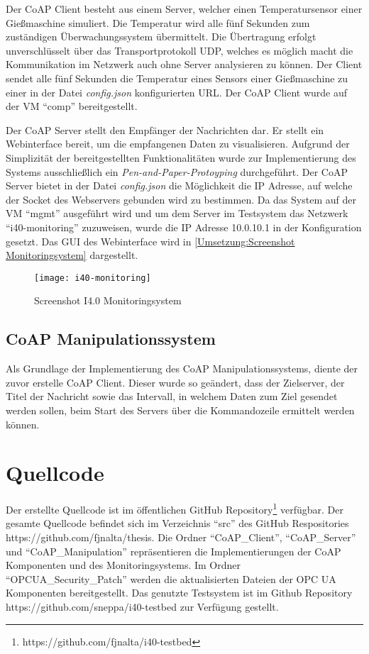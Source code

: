 Der \ac{CoAP} Client besteht aus einem Server, welcher einen Temperatursensor einer Gießmaschine simuliert. Die Temperatur wird alle fünf Sekunden zum zuständigen Überwachungssystem übermittelt. Die Übertragung erfolgt unverschlüsselt über das Transportprotokoll \ac{UDP}, welches es möglich macht die Kommunikation im Netzwerk auch ohne Server analysieren zu können. Der Client sendet alle fünf Sekunden die Temperatur eines Sensors einer Gießmaschine zu einer in der Datei \textit{config.json} konfigurierten \ac{URL}. Der \ac{CoAP} Client wurde auf der \ac{VM} "`comp"' bereitgestellt.

Der \ac{CoAP} Server stellt den Empfänger der Nachrichten dar. Er stellt ein Webinterface bereit, um die empfangenen Daten zu visualisieren. Aufgrund der Simplizität der bereitgestellten Funktionalitäten wurde zur Implementierung des Systems ausschließlich ein \textit{Pen-and-Paper-Protoyping} durchgeführt. Der \ac{CoAP} Server bietet in der Datei \textit{config.json} die Möglichkeit die \ac{IP} Adresse, auf welche der Socket des Webservers gebunden wird zu bestimmen. Da das System auf der \ac{VM} "`mgmt"' ausgeführt wird und um dem Server im Testsystem das Netzwerk "`i40-monitoring"' zuzuweisen, wurde die \ac{IP} Adresse 10.0.10.1 in der Konfiguration gesetzt. Das \ac{GUI} des Webinterface wird in \autoref{Umsetzung:Screenshot Monitoringsystem} dargestellt.

\begin{figure}[h]
    \centering
    \texttt{[image: i40-monitoring]}
    \caption{Screenshot I4.0 Monitoringsystem} 
    \label{Umsetzung:Screenshot Monitoringsystem}
\end{figure}  

\subsection{\ac{CoAP} Manipulationssystem}
Als Grundlage der Implementierung des \ac{CoAP} Manipulationssystems, diente der zuvor erstelle \ac{CoAP} Client. Dieser wurde so geändert, dass der Zielserver, der Titel der Nachricht sowie das Intervall, in welchem Daten zum Ziel gesendet werden sollen, beim Start des Servers über die Kommandozeile ermittelt werden können.

\section{Quellcode}
Der erstellte Quellcode ist im öffentlichen GitHub Repository\footnote{https://github.com/fjnalta/i40-testbed} verfügbar. Der gesamte Quellcode befindet sich im Verzeichnis "`src"' des GitHub Respositories https://github.com/fjnalta/thesis. Die Ordner "`CoAP\_Client"', "`CoAP\_Server"' und "`CoAP\_Manipulation"' repräsentieren die Implementierungen der \ac{CoAP} Komponenten und des Monitoringsystems. Im Ordner "`OPCUA\_Security\_Patch"' werden die aktualisierten Dateien der \ac{OPC UA} Komponenten bereitgestellt. Das genutzte Testsystem ist im Github Repository https://github.com/sneppa/i40-testbed zur Verfügung gestellt.

